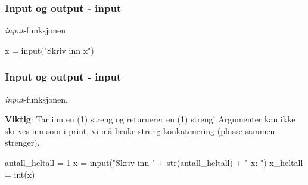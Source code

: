 
\begin{frame}[fragile]
    \frametitle{Input og output - input}

    \textit{input}-funksjonen

\begin{python}
x = input("Skriv inn x")
\end{python}

\end{frame}

\begin{frame}[fragile]
    \frametitle{Input og output - input}

    \textit{input}-funksjonen.

    \textbf{Viktig}: Tar inn en (1) streng og returnerer en (1) streng! Argumenter kan ikke skrives inn som i print, vi må bruke streng-konkatenering (plusse sammen strenger). 

\begin{python}
antall_heltall = 1
x = input("Skriv inn " + str(antall_heltall) + " x: ")
x_heltall = int(x)
\end{python}

\end{frame}

